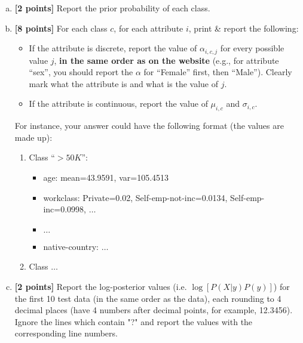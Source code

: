 \documentclass{article}
\newenvironment{soln}{
	\leavevmode\color{blue}\ignorespaces
}{}
\begin{document}
\begin{enumerate}[(a)]
\item \textbf{[2 points]} Report the prior probability of each class. \\
\begin{soln}

\end{soln}

\item \textbf{[8 points]} For each class $c$, for each attribute $i$, print \& report the following:
\begin{itemize}
\item If the attribute is discrete, report the value of $\alpha_{i, c, j}$ for every possible value $j$, \textbf{in the same order as on the website} (e.g., for attribute ``sex'', you should report the $\alpha$ for ``Female'' first, then ``Male''). Clearly mark what the attribute is and what is the value of $j$. 
\item If the attribute is continuous, report the value of $\mu_{i, c}$ and $\sigma_{i, c}$. 
\end{itemize}
For instance, your answer could have the following format (the values are made up):
\begin{framed}
\begin{enumerate}[(1)]
\item Class ``$>50K$'':
\begin{itemize}
\item age: mean=43.9591, var=105.4513
\item workclass: Private=0.02, Self-emp-not-inc=0.0134, Self-emp-inc=0.0998, $\dots$
\item $\dots$
\item native-country: $\dots$
\end{itemize}
\item Class $\dots$
\end{enumerate}
\end{framed}

\item \textbf{[2 points]} Report the log-posterior values (i.e. $\log [P(X|y)P(y)]$) for the first 10 test data (in the same order as the data), each rounding to 4 decimal places (have 4 numbers after decimal points, for example, 12.3456). Ignore the lines which contain "?" and report the values with the corresponding line numbers. \\
\begin{soln}

\end{soln}

\end{enumerate}
\end{document}
